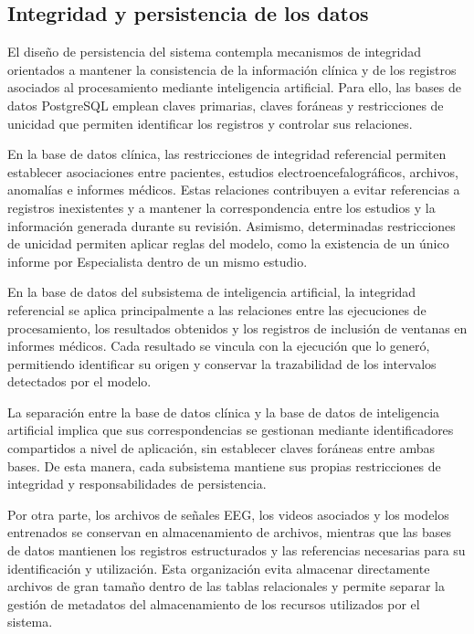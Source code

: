 \subsection{Integridad y persistencia de los datos}
\label{subsec:integridad-persistencia-datos}

El diseño de persistencia del sistema contempla mecanismos
de integridad orientados a mantener la consistencia de
la información clínica y de los registros asociados al
procesamiento mediante inteligencia artificial. Para ello,
las bases de datos PostgreSQL emplean claves primarias,
claves foráneas y restricciones de unicidad que permiten
identificar los registros y controlar sus relaciones.

En la base de datos clínica, las restricciones de integridad
referencial permiten establecer asociaciones entre pacientes,
estudios electroencefalográficos, archivos, anomalías e
informes médicos. Estas relaciones contribuyen a evitar
referencias a registros inexistentes y a mantener la
correspondencia entre los estudios y la información generada
durante su revisión. Asimismo, determinadas restricciones
de unicidad permiten aplicar reglas del modelo, como la
existencia de un único informe por Especialista dentro
de un mismo estudio.

En la base de datos del subsistema de inteligencia artificial,
la integridad referencial se aplica principalmente a las
relaciones entre las ejecuciones de procesamiento, los
resultados obtenidos y los registros de inclusión de ventanas
en informes médicos. Cada resultado se vincula con la
ejecución que lo generó, permitiendo identificar su origen
y conservar la trazabilidad de los intervalos detectados
por el modelo.

La separación entre la base de datos clínica y la base
de datos de inteligencia artificial implica que sus
correspondencias se gestionan mediante identificadores
compartidos a nivel de aplicación, sin establecer claves
foráneas entre ambas bases. De esta manera, cada subsistema
mantiene sus propias restricciones de integridad y
responsabilidades de persistencia.

Por otra parte, los archivos de señales EEG, los videos
asociados y los modelos entrenados se conservan en
almacenamiento de archivos, mientras que las bases de datos
mantienen los registros estructurados y las referencias
necesarias para su identificación y utilización. Esta
organización evita almacenar directamente archivos de gran
tamaño dentro de las tablas relacionales y permite separar
la gestión de metadatos del almacenamiento de los recursos
utilizados por el sistema.

